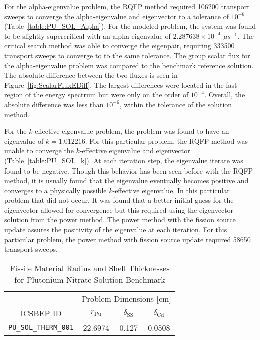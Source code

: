 For the alpha-eigenvalue problem, the RQFP method required 106200 transport sweeps to converge the alpha-eigenvalue and eigenvector to a tolerance of $10^{-6}$ (Table~\ref{table:PU_SOL_Alpha}). For the modeled problem, the system was found to be slightly supercritical with an alpha-eigenvalue of $2.287638 \times 10^{-4} $ $\mu s^{-1}$. The critical search method was able to converge the eigenpair, requiring 333500 transport sweeps to converge to to the same tolerance. The group scalar flux for the alpha-eigenvalue problem was compared to the benchmark reference solution. The absolute difference between the two  fluxes is seen in Figure~\ref{fig:ScalarFluxEDiff}. The largest differences were located in the fast region of the energy spectrum but were only on the order of $10^{-4}$. Overall, the absolute difference was less than $10^{-6}$, within the tolerance of the solution method.

For the $k$-effective eigenvalue problem, the problem was found to have an eigenvalue of $k = 1.012216$. For this particular problem, the RQFP method was unable to converge the $k$-effective eigenvalue and eigenvector (Table~\ref{table:PU_SOL_k}). At each iteration step, the eigenvalue iterate was found to be negative. Though this behavior has been seen before with the RQFP method, it is usually found that the eigenvalue eventually becomes positive and converges to a physically possible $k$-effective eigenvalue. In this particular problem that did not occur. It was found that a better initial guess for the eigenvector allowed for convergence but this required using the eigenvector solution from the power method. The power method with the fission source update assures the positivity of the eigenvalue at each iteration. For this particular problem, the power method with fission source update required 58650 transport sweeps.

\begin{table}[!htbp]
	\centering{}
	\begin{tabular}{@{}cccc@{}}\toprule
	& \multicolumn{3}{c}{Problem Dimensions [cm]} \\
	\cmidrule{2-4} ICSBEP ID & $r_{\text{Pu}}$ & $\delta_{\text{SS}}$ & $\delta_{\text{Cd}}$ \\
	\midrule
	\texttt{PU\_SOL\_THERM\_001} & 22.6974 & 0.127 & 0.0508 \\
	\bottomrule
	\end{tabular}
	\caption{Fissile Material Radius and Shell Thicknesses for Plutonium-Nitrate Solution Benchmark}
	\label{table:PU_SOL_Dims}
\end{table}


